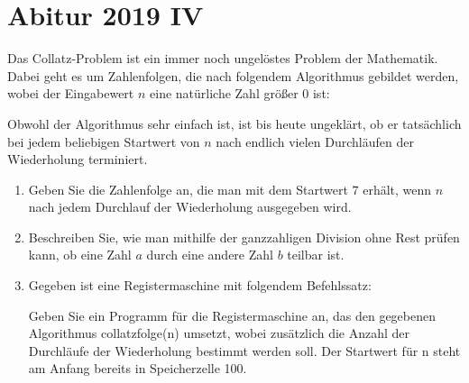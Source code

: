 \documentclass{lehramt-informatik-aufgabe}
\begin{document}

\section{Abitur 2019 IV}

Das Collatz-Problem ist ein immer noch ungelöstes Problem der
Mathematik. Dabei geht es um Zahlenfolgen, die nach folgendem
Algorithmus gebildet werden, wobei der Eingabewert $n$ eine natürliche
Zahl größer $0$ ist:

Obwohl der Algorithmus sehr einfach ist, ist bis heute ungeklärt, ob er
tatsächlich bei jedem beliebigen Startwert von $n$ nach endlich vielen
Durchläufen der Wiederholung terminiert.

\begin{enumerate}


\item Geben Sie die Zahlenfolge an, die man mit dem Startwert $7$ erhält,
wenn $n$ nach jedem Durchlauf der Wiederholung ausgegeben wird.


\item Beschreiben Sie, wie man mithilfe der ganzzahligen Division ohne
Rest prüfen kann, ob eine Zahl $a$ durch eine andere Zahl $b$ teilbar
ist.


\item Gegeben ist eine Registermaschine mit folgendem Befehlssatz:

Geben Sie ein Programm für die Registermaschine an, das den gegebenen
Algorithmus collatzfolge(n) umsetzt, wobei zusätzlich die Anzahl der
Durchläufe der Wiederholung bestimmt werden soll. Der Startwert für n
steht am Anfang bereits in Speicherzelle 100.

\end{enumerate}
\end{document}
